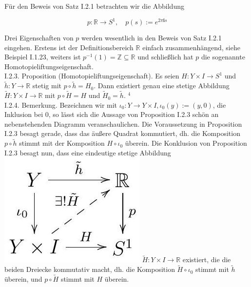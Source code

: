 \documentclass[10pt]{article}
\begin{document}
Für den Beweis von Satz I.2.1 betrachten wir die Abbildung

$$
p: \mathbb{R} \rightarrow S^{1}, \quad p(s):=e^{2 \pi \mathbf{i} s}
$$

Drei Eigenschaften von $p$ werden wesentlich in den Beweis von Satz I.2.1 eingehen. Erstens ist der Definitionsbereich $\mathbb{R}$ einfach zusammenhängend, siehe Beispiel I.1.23, weiters ist $p^{-1}(1)=\mathbb{Z} \subseteq \mathbb{R}$ und schließlich hat $p$ die sogenannte Homotopieliftungseigenschaft.\\
I.2.3. Proposition (Homotopieliftungseigenschaft). Es seien $H: Y \times I \rightarrow S^{1}$ und $\tilde{h}: Y \rightarrow \mathbb{R}$ stetig mit $p \circ \tilde{h}=H_{0}$. Dann existiert genau eine stetige Abbildung $\tilde{H}: Y \times I \rightarrow \mathbb{R}$ mit $p \circ \tilde{H}=H$ und $\tilde{H}_{0}=\tilde{h}$. ${ }^{4}$\\
I.2.4. Bemerkung. Bezeichnen wir mit $\iota_{0}: Y \rightarrow Y \times I, \iota_{0}(y):=(y, 0)$, die Inklusion bei 0, so lässt sich die Aussage von Proposition I.2.3 schön an nebenstehenden Diagramm veranschaulichen. Die Voraussetzung in Proposition I.2.3 besagt gerade, dass das äußere Quadrat kommutiert, dh. die Komposition $p \circ \tilde{h}$ stimmt mit der Komposition $H \circ \iota_{0}$ überein. Die Konklusion von Proposition I.2.3 besagt nun, dass eine eindeutige stetige Abbildung\\
\includegraphics[max width=\textwidth]{2025_06_05_d7ed2bacd1e9ce1db1f0g-015} $\tilde{H}: Y \times I \rightarrow \mathbb{R}$ existiert, die die beiden Dreiecke kommutativ macht, dh. die Komposition $\tilde{H} \circ \iota_{0}$ stimmt mit $\tilde{h}$ überein, und $p \circ \tilde{H}$ stimmt mit $H$ überein.\\
\end{document}
